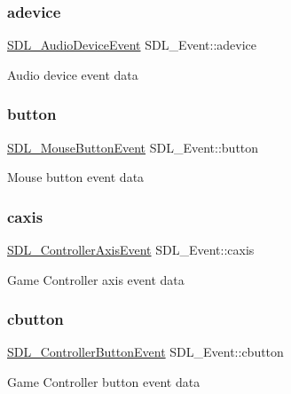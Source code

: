 \subsubsection{\texorpdfstring{adevice}{adevice}}
{\footnotesize\ttfamily \mbox{\hyperlink{struct_s_d_l___audio_device_event}{S\+D\+L\+\_\+\+Audio\+Device\+Event}} S\+D\+L\+\_\+\+Event\+::adevice}

Audio device event data \mbox{\label{union_s_d_l___event_ab6da2fa2687e5f849f270adecc64785f}} 
\subsubsection{\texorpdfstring{button}{button}}
{\footnotesize\ttfamily \mbox{\hyperlink{struct_s_d_l___mouse_button_event}{S\+D\+L\+\_\+\+Mouse\+Button\+Event}} S\+D\+L\+\_\+\+Event\+::button}

Mouse button event data \mbox{\label{union_s_d_l___event_aa8f6df0f2716fae56204b12ab4a4c289}} 
\subsubsection{\texorpdfstring{caxis}{caxis}}
{\footnotesize\ttfamily \mbox{\hyperlink{struct_s_d_l___controller_axis_event}{S\+D\+L\+\_\+\+Controller\+Axis\+Event}} S\+D\+L\+\_\+\+Event\+::caxis}

Game Controller axis event data \mbox{\label{union_s_d_l___event_aee2b5671c8dcdb447023715cc21593cb}} 
\subsubsection{\texorpdfstring{cbutton}{cbutton}}
{\footnotesize\ttfamily \mbox{\hyperlink{struct_s_d_l___controller_button_event}{S\+D\+L\+\_\+\+Controller\+Button\+Event}} S\+D\+L\+\_\+\+Event\+::cbutton}

Game Controller button event data \mbox{\label{union_s_d_l___event_ad3beed01e690b885728e0b0e1d636378}} 
